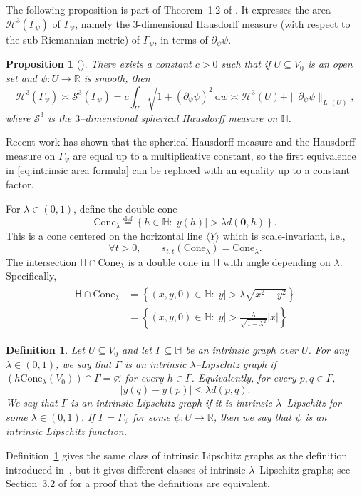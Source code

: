 \documentclass[11pt,reqno]{amsart}
\renewcommand{\H}{\mathbb{H}}
\newcommand{\R}{\mathbb{R}}
\newcommand{\cH}{\mathcal{H}}
\newcommand{\cS}{\mathcal{S}}
\renewcommand{\approx}{\asymp}
\newcommand{\ud}[0]{\,\mathrm{d}}
\newcommand{\0}{\mathbf{0}}
\renewcommand{\1}{\mathbf 1}
\newcommand{\from}{\colon}
\renewcommand{\mid}{:}
\renewcommand{\subset}{\subseteq}
\newcommand{\eqdef}{\stackrel{\mathrm{def}}{=}}
\renewcommand{\le}{\leqslant}
\renewcommand{\emptyset}{\varnothing}
\newtheorem{prop}[thm]{Proposition}
\newtheorem{defn}[thm]{Definition}
\theoremstyle{remark}
\begin{document}
The following proposition is part of Theorem~1.2 of \cite{AVSCIntrinsic}. It expresses the area $\cH^{3}(\Gamma_\psi)$ of $\Gamma_\psi$, namely the 3-dimensional Hausdorff measure (with respect to the sub-Riemannian metric) of $\Gamma_\psi$, in terms of $\partial_\psi \psi$.
\begin{prop}[\cite{AVSCIntrinsic}]\label{prop:areaIntegral}
  There exists a constant  $c>0$ such that if $U\subset V_0$ is an open set and $\psi\from U\to \R$ is smooth, then
  \begin{equation}\label{eq:intrinsic area formula}
    \cH^3(\Gamma_\psi)\approx \cS^{3}(\Gamma_\psi)=c\int_U \sqrt{1+(\partial_\psi \psi)^2}\ud w\asymp \cH^3(U)+\|\partial_\psi \psi\|_{L_1(U)},
  \end{equation}
  where $\cS^3$ is the $3$--dimensional spherical Hausdorff measure on $\H$.
\end{prop}
Recent work \cite{JulNicVit} has shown that the spherical Hausdorff measure and the Hausdorff measure on $\Gamma_\psi$ are equal up to a multiplicative constant, so the first equivalence in \eqref{eq:intrinsic area formula} can be replaced with an equality up to a constant factor.

For $\lambda\in (0,1)$, define the double cone
$$
\mathrm{Cone}_\lambda\eqdef \left\{h\in \H \mid |y(h)|>\lambda d(\0,h)\right\}.
$$
This is a cone centered on the horizontal line $\langle Y\rangle$ which is scale-invariant, i.e., $$\forall  t>0,\qquad s_{t,t}(\mathrm{Cone}_\lambda)=\mathrm{Cone}_\lambda.$$
The intersection $\mathsf{H}\cap \mathrm{Cone}_\lambda$ is a double cone in $\mathsf{H}$ with angle depending on $\lambda$.  Specifically,
\begin{align}\label{eq:formula for intersection with cone}
\begin{split}
  \mathsf{H}\cap \mathrm{Cone}_\lambda
  &=\left\{(x,y,0)\in \H\mid |y| > \lambda \sqrt{x^2+y^2}\right\}\\
  &=\left\{(x,y,0)\in \H\mid |y| > \frac{\lambda}{\sqrt{1-\lambda^2}} |x|\right\}.
  \end{split}
\end{align}

\begin{defn}\label{def:intrinsic lipschitz graph}
  Let $U\subset V_0$ and let $\Gamma\subset \H$ be an intrinsic graph over $U$.  For  any $\lambda\in (0,1)$, we say that $\Gamma$ is an {\em intrinsic $\lambda$--Lipschitz graph} if $(h \mathrm{Cone}_\lambda(V_0))\cap \Gamma=\emptyset$ for every $h\in \Gamma$.  Equivalently, for every $p,q\in \Gamma$,
  $$|y(q)-y(p)| \le \lambda d(p,q).$$
  We say that $\Gamma$ is an \emph{intrinsic Lipschitz graph} if it is intrinsic $\lambda$--Lipschitz for some $\lambda\in (0,1)$.  If $\Gamma=\Gamma_\psi$ for some $\psi\from U\to \R$, then we say that $\psi$ is an \emph{intrinsic Lipschitz function}.
\end{defn}
Definition~\ref{def:intrinsic lipschitz graph} gives the same class of intrinsic Lipschitz graphs as the definition introduced in~\cite{FSSC06}, but it gives different classes of intrinsic $\lambda$--Lipschitz graphs; see Section~3.2 of \cite{RigotQuantitative} for a proof that the definitions are equivalent.
\end{document}
